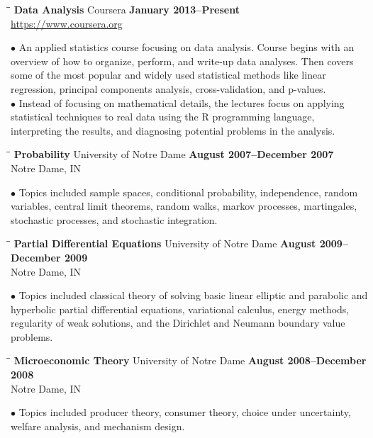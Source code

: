 \documentclass{resume}
\begin{document}
\begin{resume}
\begin{tabbing}
		\hspace{2.3in}\= \hspace{2.6in}\= \kill
        {\bf Data Analysis} \> Coursera \>  
	\textbf{January 2013--Present}\\
		\>\href{https://www.coursera.org}{https://www.coursera.org}
	\end{tabbing}\vspace{-15pt}
$\bullet$
An applied statistics course focusing on data analysis. Course begins with an overview of how to organize, perform, and write-up data analyses. Then covers some of the most popular and widely used statistical methods like linear regression, principal components analysis, cross-validation, and p-values.
\\
$\bullet$ Instead of focusing on mathematical details, the lectures focus on applying statistical techniques to real data using the R programming language, interpreting the results, and diagnosing potential problems in the analysis. 
\begin{tabbing}
		\hspace{2.3in}\= \hspace{2.6in}\= \kill
        {\bf Probability } \> University of Notre Dame \>  
	\textbf{August 2007--December 2007}\\
		\>Notre Dame, IN 
	\end{tabbing}\vspace{-15pt}
$\bullet$ Topics included sample spaces, conditional probability, independence, random variables, central limit theorems, random walks, markov processes, martingales, stochastic processes, and stochastic integration.

\begin{tabbing}
		\hspace{2.3in}\= \hspace{2.6in}\= \kill
        {\bf Partial Differential Equations} \> University of Notre Dame \>  
	\textbf{August 2009--December 2009}\\
		\>Notre Dame, IN 
	\end{tabbing}\vspace{-15pt}
$\bullet$ Topics included classical theory of solving basic linear elliptic and parabolic and hyperbolic partial differential equations,
variational calculus, energy methods, regularity of weak solutions,
and the Dirichlet and Neumann boundary value
problems.
\begin{tabbing}
		\hspace{2.3in}\= \hspace{2.6in}\= \kill
        {\bf Microeconomic Theory } \> University of Notre Dame \>  
	\textbf{August 2008--December 2008}\\
		\>Notre Dame, IN 
	\end{tabbing}\vspace{-15pt}
$\bullet$ Topics included producer theory, consumer theory, choice under uncertainty, welfare analysis, and mechanism design.


\end{resume}
\end{document}
